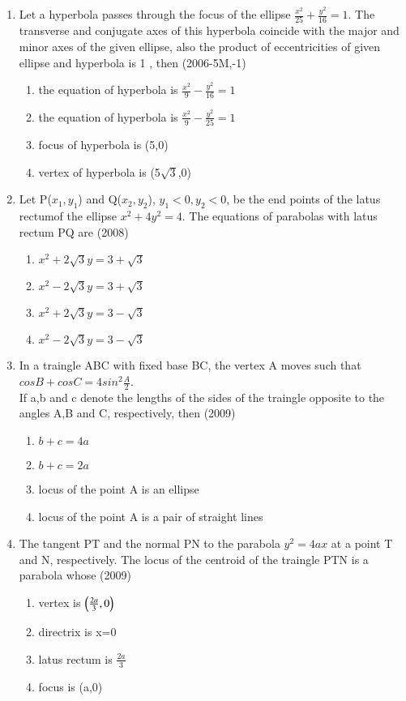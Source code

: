 \documentclass[journal,12pt,onecolumn]{IEEEtran}
\theoremstyle{remark}
\begin{document}
\begin{enumerate}
\item Let a hyperbola passes through the focus of the ellipse \textbf{$\frac{x^2}{25}+\frac{y^2}{16}=1$}. The transverse and conjugate axes of this hyperbola coincide with the major and minor axes of the given ellipse, also the product of eccentricities of given ellipse and hyperbola is 1 , then \hfill (2006-5M,-1)\\
	\begin{enumerate}
		\item the equation of hyperbola is $\frac{x^2}{9}-\frac{y^2}{16}=1$
		\item the equation of hyperbola is $\frac{x^2}{9}-\frac{y^2}{25}=1$
		\item focus of hyperbola is (5,0)
		\item vertex of hyperbola is (5$\sqrt{3}$,0)
	\end{enumerate}

\item Let P($x_{1},y_{1}$) and Q($x_{2},y_{2}$), $y_{1}<0,y_{2}<0$, be the end points of the latus rectumof the ellipse $x^2+4y^2=4$. The equations of parabolas with latus rectum PQ are \hfill(2008)\\
	\begin{enumerate}
		\item $x^2+2\sqrt{3}y=3+\sqrt{3}$
		\item $x^2-2\sqrt{3}y=3+\sqrt{3}$
		\item $x^2+2\sqrt{3}y=3-\sqrt{3}$
		\item $x^2-2\sqrt{3}y=3-\sqrt{3}$
	\end{enumerate}

\item In a traingle ABC with fixed base BC, the vertex A moves such that\\
	\hspace{1.5cm}$cosB+cosC=4sin^2\frac{A}{2}$.\\
		If a,b and c denote the lengths of the sides of the traingle opposite to the angles A,B and C, respectively, then \hfill(2009)\\
		\begin{enumerate}
			\item $b+c=4a$
			\item $b+c=2a$
			\item locus of the point A is an ellipse
			\item locus of the point A is a pair of straight lines
		\end{enumerate}

	\item The tangent PT and the normal PN to the parabola $y^2=4ax$ at a point T and N, respectively. The locus of the centroid of the traingle PTN is a parabola whose \hfill(2009)\\
		\begin{enumerate}
			\item vertex is $\left(\frac{2a}{3},0\right)$
			\item directrix is x=0
			\item latus rectum is $\frac{2a}{3}$
			\item focus is (a,0)
		\end{enumerate}


\end{enumerate}
\end{document}
